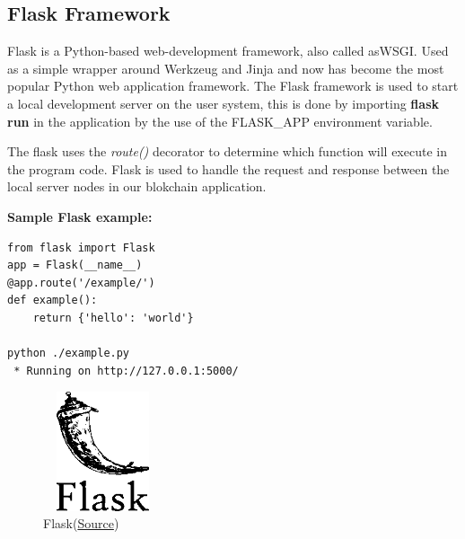 \documentclass[12pt]{article}
\begin{document}
\subsection{Flask Framework}
Flask is a Python-based web-development framework, also called as\ac{WSGI}. Used as a simple wrapper around Werkzeug and Jinja and now has become the most popular Python web application framework. The Flask framework is used to start a local development server on the user system, this is done by importing \textbf{flask run} in the application by the use of the FLASK\_APP environment variable.
\begin{flushleft}
The flask uses the \emph{route()} decorator to determine which function will execute in the program code. Flask is used to handle the request and response between the local server nodes in our blokchain application.
\end{flushleft} \par
\textbf{Sample Flask example:}
\begin{lstlisting}
from flask import Flask
app = Flask(__name__)
@app.route('/example/')
def example():
    return {'hello': 'world'}

python ./example.py
 * Running on http://127.0.0.1:5000/
\end{lstlisting}
\begin{figure}[H]
    \centering
    \includegraphics[width=3.5cm, height=3.5cm]{../report_MemeEcon/images/flask.png}
    \caption{Flask(\href{https://palletsprojects.com/p/flask/}{Source})}
    \label{fig:Flask}
\end{figure}
\end{document}
